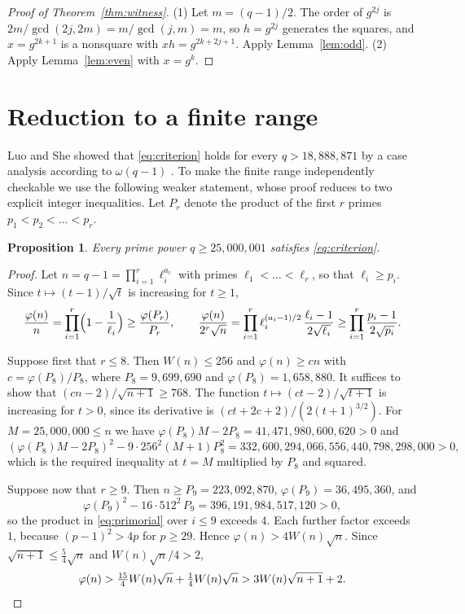 \documentclass{amsart}
\newtheorem{proposition}[theorem]{Proposition}
\theoremstyle{remark}
\numberwithin{equation}{section}
\numberwithin{table}{section}
\begin{document}
\begin{proof}[Proof of Theorem~\ref{thm:witness}]
(1) Let $m=(q-1)/2$. The order of $g^{2j}$ is $2m/\gcd(2j,2m)=m/\gcd(j,m)=m$, so $h=g^{2j}$ generates the squares, and $x=g^{2k+1}$ is a nonsquare with $xh=g^{2k+2j+1}$. Apply Lemma~\ref{lem:odd}. (2) Apply Lemma~\ref{lem:even} with $x=g^{k}$.
\end{proof}

\section{Reduction to a finite range}\label{sec:tail}

Luo and She showed that \eqref{eq:criterion} holds for every $q>18{,}888{,}871$ by a case analysis according to $\omega(q-1)$ \cite[Section~3]{LS}. To make the finite range independently checkable we use the following weaker statement, whose proof reduces to two explicit integer inequalities. Let $P_r$ denote the product of the first $r$ primes $p_1<p_2<\dots<p_r$.

\begin{proposition}\label{prop:tail}
Every prime power $q\ge 25{,}000{,}001$ satisfies \eqref{eq:criterion}.
\end{proposition}

\begin{proof}
Let $n=q-1=\prod_{i=1}^{r}\ell_i^{a_i}$ with primes $\ell_1<\dots<\ell_r$, so that $\ell_i\ge p_i$. Since $t\mapsto(t-1)/\sqrt t$ is increasing for $t\ge1$,
\begin{equation}\label{eq:primorial}
\frac{\varphi(n)}{n}=\prod_{i=1}^{r}\Bigl(1-\frac1{\ell_i}\Bigr)\ge\frac{\varphi(P_r)}{P_r},\qquad
\frac{\varphi(n)}{2^{r}\sqrt n}=\prod_{i=1}^{r}\ell_i^{(a_i-1)/2}\,\frac{\ell_i-1}{2\sqrt{\ell_i}}\ge\prod_{i=1}^{r}\frac{p_i-1}{2\sqrt{p_i}}.
\end{equation}

Suppose first that $r\le8$. Then $W(n)\le256$ and $\varphi(n)\ge cn$ with $c=\varphi(P_8)/P_8$, where $P_8=9{,}699{,}690$ and $\varphi(P_8)=1{,}658{,}880$. It suffices to show that $(cn-2)/\sqrt{n+1}\ge768$. The function $t\mapsto(ct-2)/\sqrt{t+1}$ is increasing for $t>0$, since its derivative is $(ct+2c+2)/(2(t+1)^{3/2})$. For $M=25{,}000{,}000\le n$ we have $\varphi(P_8)M-2P_8=41{,}471{,}980{,}600{,}620>0$ and
\[
(\varphi(P_8)M-2P_8)^{2}-9\cdot256^{2}(M+1)P_8^{2}=332{,}600{,}294{,}066{,}556{,}440{,}798{,}298{,}000>0,
\]
which is the required inequality at $t=M$ multiplied by $P_8$ and squared.

Suppose now that $r\ge9$. Then $n\ge P_9=223{,}092{,}870$, $\varphi(P_9)=36{,}495{,}360$, and
\[
\varphi(P_9)^{2}-16\cdot512^{2}\,P_9=396{,}191{,}984{,}517{,}120>0,
\]
so the product in \eqref{eq:primorial} over $i\le9$ exceeds $4$. Each further factor exceeds $1$, because $(p-1)^2>4p$ for $p\ge29$. Hence $\varphi(n)>4W(n)\sqrt n$. Since $\sqrt{n+1}\le\frac54\sqrt n$ and $W(n)\sqrt n/4>2$,
\[
\varphi(n)>\tfrac{15}{4}W(n)\sqrt n+\tfrac14W(n)\sqrt n> 3W(n)\sqrt{n+1}+2.\qedhere
\]
\end{proof}
\end{document}
